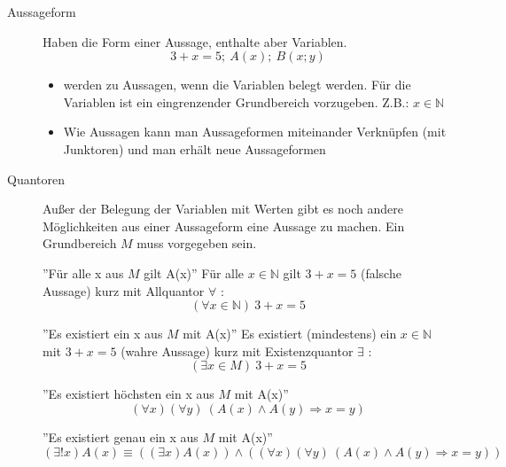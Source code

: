 \begin{description}
    \item[Aussageform] Haben die Form einer Aussage, enthalte aber Variablen.
    $$3 + x = 5;\ A(x);\ B(x;y)$$
    \begin{itemize}
        \item werden zu Aussagen, wenn die Variablen belegt werden. Für die Variablen ist ein eingrenzender Grundbereich vorzugeben. Z.B.: $x \in \mathbb{N}$
        \item Wie Aussagen kann man Aussageformen miteinander Verknüpfen (mit Junktoren) und man erhält neue Aussageformen
    \end{itemize}
    \item[Quantoren] Außer der Belegung der Variablen mit Werten gibt es noch andere Möglichkeiten aus einer Aussageform eine Aussage zu machen. Ein Grundbereich $M$ muss vorgegeben sein.

    ''Für alle x aus $M$ gilt A(x)'' \newline
    Für alle $x \in \mathbb{N}$ gilt $3 + x = 5$ (falsche Aussage) kurz mit Allquantor $\forall$ :
    $$(\forall x \in \mathbb{N})\ 3 + x = 5$$

    ''Es existiert ein x aus $M$ mit A(x)'' \newline
    Es existiert (mindestens) ein $x \in \mathbb{N}$ mit $3 + x = 5$ (wahre Aussage) kurz mit Existenzquantor $\exists$ :
    $$(\exists x \in M)\ 3 + x = 5$$

    ''Es existiert höchsten ein x aus $M$ mit A(x)''
    $$(\forall x)(\forall y)\ (A(x) \wedge A(y) \Rightarrow x = y)$$

    ''Es existiert genau ein x aus $M$ mit A(x)''
    $$(\exists ! x) A(x) \equiv ((\exists x) A(x)) \wedge ((\forall x)(\forall y)\ (A(x) \wedge A(y) \Rightarrow x = y))$$
\end{description}
